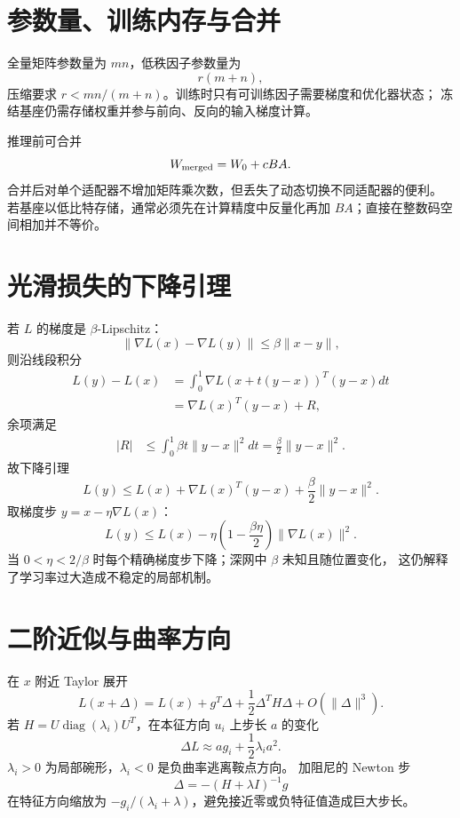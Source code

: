 \documentclass[11pt]{article}
\numberwithin{equation}{section}
\newcommand{\1}{\mathbf{1}}
\newcommand{\diag}{\operatorname{diag}}
\begin{document}
\section{参数量、训练内存与合并}

全量矩阵参数量为 $mn$，低秩因子参数量为
\begin{equation}
 r(m+n),
\end{equation}
压缩要求 $r<mn/(m+n)$。训练时只有可训练因子需要梯度和优化器状态；
冻结基座仍需存储权重并参与前向、反向的输入梯度计算。

推理前可合并
\begin{equation}
 W_{\rm merged}=W_0+cBA.
\end{equation}
合并后对单个适配器不增加矩阵乘次数，但丢失了动态切换不同适配器的便利。
若基座以低比特存储，通常必须先在计算精度中反量化再加 $BA$；直接在整数码空间相加并不等价。

\section{光滑损失的下降引理}

若 $L$ 的梯度是 $\beta$-Lipschitz：
\begin{equation}
 \|\nabla L(x)-\nabla L(y)\|
 \le\beta\|x-y\|,
\end{equation}
则沿线段积分
\begin{align}
 L(y)-L(x)
 &=\int_0^1\nabla L(x+t(y-x))^T(y-x)dt\\
 &=\nabla L(x)^T(y-x)+R,
\end{align}
余项满足
\begin{align}
 |R|
 &\le\int_0^1\beta t\|y-x\|^2dt
 =\frac\beta2\|y-x\|^2.
\end{align}
故下降引理
\begin{equation}
 L(y)\le L(x)+\nabla L(x)^T(y-x)
 +\frac\beta2\|y-x\|^2.
\end{equation}
取梯度步 $y=x-\eta\nabla L(x)$：
\begin{equation}
 L(y)\le L(x)-\eta\left(1-\frac{\beta\eta}{2}\right)
 \|\nabla L(x)\|^2.
\end{equation}
当 $0<\eta<2/\beta$ 时每个精确梯度步下降；深网中 $\beta$ 未知且随位置变化，
这仍解释了学习率过大造成不稳定的局部机制。

\section{二阶近似与曲率方向}

在 $x$ 附近 Taylor 展开
\begin{equation}
 L(x+\Delta)=L(x)+g^T\Delta
 +\frac12\Delta^TH\Delta+O(\|\Delta\|^3).
\end{equation}
若 $H=U\diag(\lambda_i)U^T$，在本征方向 $u_i$ 上步长 $a$ 的变化
\begin{equation}
 \Delta L\approx a g_i+\frac12\lambda_i a^2.
\end{equation}
$\lambda_i>0$ 为局部碗形，$\lambda_i<0$ 是负曲率逃离鞍点方向。
加阻尼的 Newton 步
\begin{equation}
 \Delta=-(H+\lambda I)^{-1}g
\end{equation}
在特征方向缩放为 $-g_i/(\lambda_i+\lambda)$，避免接近零或负特征值造成巨大步长。
\end{document}
